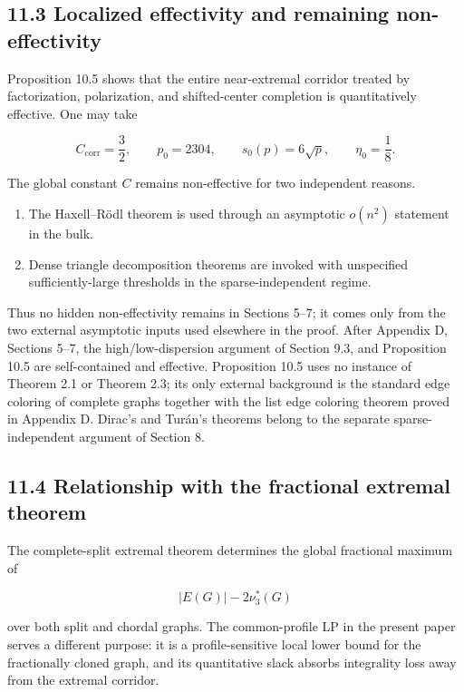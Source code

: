 \documentclass[
  american,
  11pt,
  a4paper,
]{article}
\providecommand{\tightlist}{%
  \setlength{\itemsep}{0pt}\setlength{\parskip}{0pt}}
\begin{document}
\subsection{11.3 Localized effectivity and remaining non-effectivity}\label{localized-effectivity-and-remaining-non-effectivity}

Proposition 10.5 shows that the entire near-extremal corridor treated by factorization, polarization, and shifted-center completion is quantitatively effective. One may take

\[
C_{\mathrm{corr}}=\frac32,
\qquad
p_0=2304,
\qquad
s_0(p)=6\sqrt p,
\qquad
\eta_0=\frac18.
\]

The global constant \(C\) remains non-effective for two independent reasons.

\begin{enumerate}
\def\labelenumi{\arabic{enumi}.}
\tightlist
\item
  The Haxell--Rödl theorem is used through an asymptotic \(o(n^2)\) statement in the bulk.
\item
  Dense triangle decomposition theorems are invoked with unspecified sufficiently-large thresholds in the sparse-independent regime.
\end{enumerate}

Thus no hidden non-effectivity remains in Sections 5--7; it comes only from the two external asymptotic inputs used elsewhere in the proof. After Appendix D, Sections 5--7, the high/low-dispersion argument of Section 9.3, and Proposition 10.5 are self-contained and effective. Proposition 10.5 uses no instance of Theorem 2.1 or Theorem 2.3; its only external background is the standard edge coloring of complete graphs together with the list edge coloring theorem proved in Appendix D. Dirac's and Turán's theorems belong to the separate sparse-independent argument of Section 8.

\subsection{11.4 Relationship with the fractional extremal theorem}\label{relationship-with-the-fractional-extremal-theorem}

The complete-split extremal theorem determines the global fractional maximum of

\[
|E(G)|-2\nu_3^*(G)
\]

over both split and chordal graphs. The common-profile LP in the present paper serves a different purpose: it is a profile-sensitive local lower bound for the fractionally cloned graph, and its quantitative slack absorbs integrality loss away from the extremal corridor.
\end{document}
